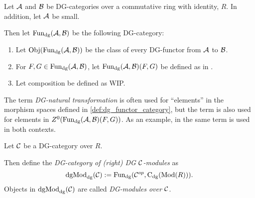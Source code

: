 \begin{definition}[\( \Fun_{\dg}(\Ac, \Bc) \)]
    \label{def:dg_functor_category}
    Let \( {\mathcal{A}} \) and \( {\mathcal{B}} \) be DG-categories over a commutative ring with identity, \( R \). In addition, let \( {\mathcal{A}} \) be small.

    Then let \( \Fun_{\dg}(\Ac, \Bc) \) be the following DG-category:
    \begin{enumerate}
        \item{
            Let \( \operatorname{Obj}(\operatorname{Fun}_{\operatorname{dg}}({\mathcal{A}}, {\mathcal{B}})) \) be the class of every DG-functor from \( {\mathcal{A}} \) to \( {\mathcal{B}} \).
        }
        \item{
            For \( F, G \in \operatorname{Fun}_{\operatorname{dg}}({\mathcal{A}}, {\mathcal{B}}) \), let \( \operatorname{Fun}_{\operatorname{dg}}({\mathcal{A}}, {\mathcal{B}})(F, G) \) be defined as in \cite[Proposition 6.3.1]{Borceux_1994}.
        }
        \item {
            Let composition be defined as WIP.
        }
    \end{enumerate}
\end{definition}

\begin{remark}
    The term \emph{DG-natural transformation} is often used for ``elements'' in the morphism spaces defined in \autoref{def:dg_functor_category}, but the term is also used for elements in \( Z^0(\operatorname{Fun}_{\operatorname{dg}}({\mathcal{A}}, {\mathcal{B}})(F, G)) \). As an example, in \cite[Definition 6.2.4, Definition 6.3.1]{Borceux_1994} the same term is used in both contexts.
\end{remark}

\begin{definition}[\( \dgMod_{\dg}(\Cc) \)]
    Let \( {\mathcal{C}} \) be a DG-category over \( R \).

    Then define the \emph{DG-category of (right) DG \( {\mathcal{C}} \)-modules} as
    \[
        \operatorname{dgMod}_{\operatorname{dg}}({\mathcal{C}}) := \operatorname{Fun}_{\operatorname{dg}}({\mathcal{C}}^{op}, \operatorname{C}_{\operatorname{dg}}(\operatorname{Mod}(R))).
    \]
    Objects in \( \dgMod_{\dg}(\Cc) \) are called \emph{DG-modules over \( {\mathcal{C}} \)}.
\end{definition}

